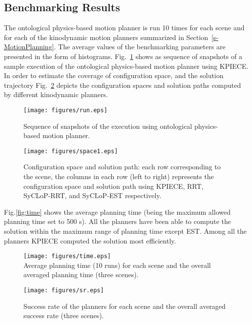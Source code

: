\documentclass[runningheads,a4paper]{llncs}
\begin{document}
\subsection{Benchmarking Results}

The ontological physics-based motion planner is run 10 times for each scene and for each of the kinodynamic motion planners summarized in
Section~\ref{s-MotionPlanning}. The average values of the benchmarking parameters are presented
in the form of histograms. Fig.~\ref{fig:run} shows as sequence of snapshots of a sample execution of the ontological physics-based motion planner using KPIECE.
In order to estimate the coverage of configuration space, and the solution trajectory Fig.~\ref{fig:cspace} depicts the configuration spaces and solution paths
computed by different kinodynamic planners.
\begin{figure}[!h]
\begin{center}
\texttt{[image: figures/run.eps]}%
\caption{Sequence of snapshots of the execution using ontological physics-based motion planner.}\label{fig:run}
\vspace{-4mm}
\end{center}
\end{figure}
\begin{figure}[!h]
\begin{center}
 \texttt{[image: figures/space1.eps]}%
\caption{Configuration space and solution path: each row corresponding to the scene, the columns in each row (left to right)
 represents the configuration space and solution path using
KPIECE, RRT, SyCLoP-RRT, and SyCLoP-EST respectively.}\label{fig:cspace}
\vspace{-7mm}
\end{center}
\end{figure}
Fig.\ref{fig:time} shows the average planning time (being the maximum allowed planning time set to 500 s). All the
planners have been able to compute the solution within the maximum range of planning time except EST. Among all the planners KPIECE computed the solution most efficiently.
\begin{figure}[!ht]
\begin{center}
\texttt{[image: figures/time.eps]}\\%
\caption{Average planning time (10 runs) for each scene and the overall averaged planning time (three scenes).} \label{fig:time}
\vspace{4mm}
\texttt{[image: figures/sr.eps]}%
\caption{Success rate of the planners for each scene and the overall averaged success rate (three scenes).} \label{fig:asr}
\end{center}
\end{figure}
\end{document}
